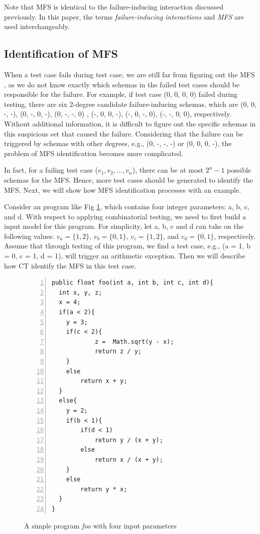 \documentclass{sig-alternate-05-2015}
\begin{document}
Note that MFS is identical to the failure-inducing interaction discussed previously. In this paper, the terms \emph{failure-inducing interactions} and \emph{MFS} are used interchangeably.

\subsection{Identification of MFS}\label{sec:pre:mfs}
When a test case fails during test case, we are still far from figuring out the MFS \cite{colbourn2008locating,martinez2008algorithms,martinez2009locating}, as we do not know exactly which schemas in the failed test cases should be responsible for the failure. For example, if test case (0, 0, 0, 0) failed during testing, there are six 2-degree candidate failure-inducing schemas, which are (0, 0, -, -), (0, -, 0, -), (0, -, -, 0) , (-, 0, 0, -), (-, 0, -, 0), (-, -, 0, 0), respectively. Without
additional information, it is difficult to figure out the specific schemas in this suspicious set that caused the failure. Considering that the failure can be triggered by schemas with other degrees, e.g., (0, -, -, -) or (0, 0, 0, -), the problem of MFS identification becomes more complicated.

In fact, for a failing test case ($v_{1},v_{2},...,v_{n}$), there can be at most $2^{n} - 1$ possible schemas for the MFS. Hence, more test cases should be generated to identify the MFS. Next, we will show how MFS identification processes with an example.

Consider an program like Fig \ref{toy-program}, which contains four integer parameters: a, b, c, and d. With respect to applying combinatorial testing, we need to first build a input model for this program. For simplicity, let a, b, c and d can take on the following values:  $v_{a} = \{ 1, 2\}$, $v_{b} = \{ 0, 1\}$, $v_{c} = \{ 1, 2\}$, and $v_{d} = \{ 0, 1\}$, respectively. Assume that through testing of this program, we find a test case, e.g., (a = 1, b = 0, c = 1, d = 1), will trigger an arithmetic exception. Then we will describe how CT identify the MFS in this test case.

\begin{figure}
\begin{Verbatim}[numbers=left,xleftmargin=5mm]
public float foo(int a, int b, int c, int d){
  int x, y, z;
  x = 4;
  if(a < 2){
    y = 3;
    if(c < 2){
            z =  Math.sqrt(y - x);
            return z / y;
    }
    else
        return x + y;
  }
  else{
    y = 2;
    if(b < 1){
        if(d < 1)
            return y / (x + y);
        else
            return x / (x + y);
    }
    else
        return y * x;
  }
}
\end{Verbatim}
\caption{A simple program \emph{foo} with four input parameters}
\label{toy-program}
\end{figure}
\end{document}
